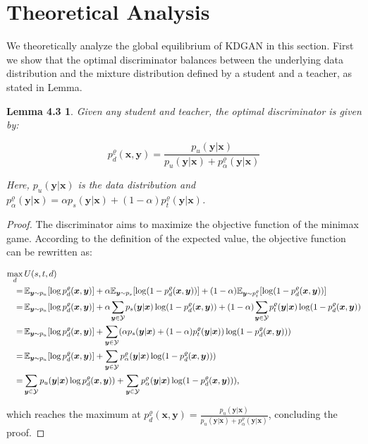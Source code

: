 \documentclass{article}
\newtheorem*{lemma1}{Lemma 4.3}
\newcommand{\OVEC}[1]{\bm{#1}} %
\newcommand{\COL}[1]{\mathcal{#1}} %
\newcommand{\UTIL}[1]{U(s,t,d)} %
\newcommand{\EXP}{\mathbb{E}} %
\newcommand{\abbrpdat}{p_{u}}
\newcommand{\fullpdat}{p_{u}(\OVEC{y}|\OVEC{x})}
\newcommand{\abbrpstd}{p_{s}}
\newcommand{\fullpstd}[1]{p_{s}(#1|\OVEC{x})}
\newcommand{\abbrptch}{p_{t}^{\varrho}}
\newcommand{\fullptch}[1]{p_{t}^{\varrho}(#1|\OVEC{x})}
\newcommand{\fullpdis}[1]{p_{d}^{\varrho}(\OVEC{x},#1)}
\newcommand{\fullpmix}{p_{\alpha}^{\varrho}(\OVEC{y}|\OVEC{x})}
\begin{document}
{
\scriptsize
% 


}


\appendix


\section{Theoretical Analysis} \label{app:theory}

We theoretically analyze the global equilibrium of KDGAN in this section.
First we show that the optimal discriminator balances between the underlying data distribution and the mixture distribution defined by a student and a teacher, as stated in Lemma.
\begin{lemma1}
Given any student and teacher, the optimal discriminator is given by:
\begin{small}
\begin{equation*}
\fullpdis{\OVEC{y}}
=
\frac{\fullpdat}{\fullpdat+\fullpmix}
\end{equation*}%
\end{small}%
Here, $\fullpdat$ is the data distribution and $\fullpmix=\alpha\fullpstd{\OVEC{y}}+(1-\alpha)\fullptch{\OVEC{y}}$.
\end{lemma1}
 
\begin{proof}
The discriminator aims to maximize the objective function of the minimax game.
According to the definition of the expected value, the objective function can be rewritten as:
\begin{small}
\begin{equation*}
\begin{aligned}
\max_{d}
&
\,
\UTIL{}
\\
=
&
\,
\EXP_{\OVEC{y}\sim\abbrpdat}[\log\fullpdis{\OVEC{y}}]
+
\alpha\EXP_{\OVEC{y}\sim\abbrpstd}[\log(1-\fullpdis{\OVEC{y}})]
+
(1-\alpha)\EXP_{\OVEC{y}\sim\abbrptch}[\log(1-\fullpdis{\OVEC{y}})]
\\
=
&
\,
\EXP_{\OVEC{y}\sim\abbrpdat}[\log\fullpdis{\OVEC{y}}]
+
\alpha\sum_{\mathclap{\OVEC{y}\in\COL{Y}}}
\fullpstd{\OVEC{y}}\log(1-\fullpdis{\OVEC{y}})
+
(1-\alpha)\sum_{\mathclap{\OVEC{y}\in\COL{Y}}}
\fullptch{\OVEC{y}}\log(1-\fullpdis{\OVEC{y}})
\\
=
&
\,
\EXP_{\OVEC{y}\sim\abbrpdat}[\log\fullpdis{\OVEC{y}}]
+
\sum_{\OVEC{y}\in\COL{Y}}
(\alpha\fullpstd{\OVEC{y}}+(1-\alpha)\fullptch{\OVEC{y}})\log(1-\fullpdis{\OVEC{y}}))
\\
=
&
\,
\EXP_{\OVEC{y}\sim\abbrpdat}[\log\fullpdis{\OVEC{y}}]
+
\sum_{\OVEC{y}\in\COL{Y}}
\fullpmix\log(1-\fullpdis{\OVEC{y}}))
\\
=
&
\sum_{\OVEC{y}\in\COL{Y}}
\fullpdat\log\fullpdis{\OVEC{y}})
+
\sum_{\OVEC{y}\in\COL{Y}}
\fullpmix\log(1-\fullpdis{\OVEC{y}}))
\text{,}
\end{aligned}
\end{equation*}%
\end{small}%
which reaches the maximum at $\fullpdis{\OVEC{y}}=\frac{\fullpdat}{\fullpdat+\fullpmix}$, concluding the proof.
\end{proof}
\end{document}
